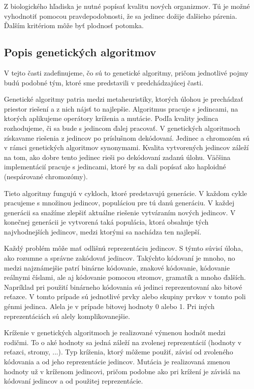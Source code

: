 Z biologického hľadiska je nutné popísať kvalitu nových organizmov. Tú je možné vyhodnotiť pomocou pravdepodobnosti, že sa jedinec dožije ďalšieho párenia. Ďalším kritériom môže byť plodnosť potomka.

\subsection{Popis genetických algoritmov}
V tejto časti zadefinujeme, čo sú to genetické algoritmy, pričom jednotlivé pojmy budú podobné tým, ktoré sme predstavili v predchádzajúcej časti. 

Genetické algoritmy patria medzi metaheuristiky, ktorých úlohou je prechádzať priestor riešení a z nich nájsť to najlepšie. Algoritmus pracuje s jedincami, na ktorých aplikujeme operátory kríženia a mutácie. Podľa kvality jedinca rozhodujeme, či sa bude s jedincom ďalej pracovať. V genetických algoritmoch získavame riešenia z jedincov po príslušnom dekódovaní. Jedinec a chromozóm sú v rámci genetických algoritmov synonymami. Kvalita vytvorených jedincov záleží na tom, ako dobre tento jedinec rieši po dekódovaní zadanú úlohu. Väčšina implementácií pracuje s jedincami, ktoré by sa dali popísať ako haploidné (nespárované chromozómy).

Tieto algoritmy fungujú v cykloch, ktoré predstavujú generácie. V každom cykle pracujeme s množinou jedincov, populáciou pre tú danú generáciu. V každej generácii sa snažíme zlepšiť aktuálne riešenie vytváraním nových jedincov. V konečnej generácii je vytvorená taká populácia, ktorá obsahuje tých najvhodnejších jedincov, medzi ktorými sa nachádza ten najlepší.

Každý problém môže mať odlišnú reprezentáciu jedincov. S týmto súvisí úloha, ako rozumne a správne zakódovať jedincov. Takýchto kódovaní je mnoho, no medzi najznámejšie patrí binárne kódovanie, znakové kódovanie, kódovanie reálnymi číslami, ale aj kódovanie pomocou stromov, gramatík a mnoho ďalších. Napríklad pri použití binárneho kódovania sú jedinci reprezentovaní ako bitové reťazce. V tomto prípade sú jednotlivé prvky alebo skupiny prvkov v tomto poli génmi jedinca. Alela je v prípade bitovej hodnoty 0 alebo 1. Pri iných reprezentáciách sú alely komplikovanejšie.

Kríženie v genetických algoritmoch je realizované výmenou hodnôt medzi rodičmi. To o aké hodnoty sa jedná záleží na zvolenej reprezentácií (hodnoty v reťazci, stromy, ...). Typ kríženia, ktorý môžeme použiť, závisí od zvoleného kódovania a od jeho reprezentácie jedincov. 
Mutácia je realizovaná zmenou hodnoty už v kríženom jedincovi, pričom podobne ako pri krížení je závislá na kódovaní jedincov a od použitej reprezentácie. 


